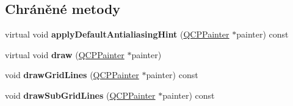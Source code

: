 \subsection*{Chráněné metody}
\begin{DoxyCompactItemize}
\item 
\hypertarget{classQCPGrid_a9916f5e38b4d6cae446537aeb47c7272}{}virtual void {\bfseries apply\+Default\+Antialiasing\+Hint} (\hyperlink{classQCPPainter}{Q\+C\+P\+Painter} $\ast$painter) const \label{classQCPGrid_a9916f5e38b4d6cae446537aeb47c7272}

\item 
\hypertarget{classQCPGrid_ad009c23f96078616aa4f66a750974b23}{}virtual void {\bfseries draw} (\hyperlink{classQCPPainter}{Q\+C\+P\+Painter} $\ast$painter)\label{classQCPGrid_ad009c23f96078616aa4f66a750974b23}

\item 
\hypertarget{classQCPGrid_a3aff10e993f6625e255c19e4f97a09d8}{}void {\bfseries draw\+Grid\+Lines} (\hyperlink{classQCPPainter}{Q\+C\+P\+Painter} $\ast$painter) const \label{classQCPGrid_a3aff10e993f6625e255c19e4f97a09d8}

\item 
\hypertarget{classQCPGrid_afa5d9d12de419e881f381f2ab7cb414d}{}void {\bfseries draw\+Sub\+Grid\+Lines} (\hyperlink{classQCPPainter}{Q\+C\+P\+Painter} $\ast$painter) const \label{classQCPGrid_afa5d9d12de419e881f381f2ab7cb414d}

\end{DoxyCompactItemize}
